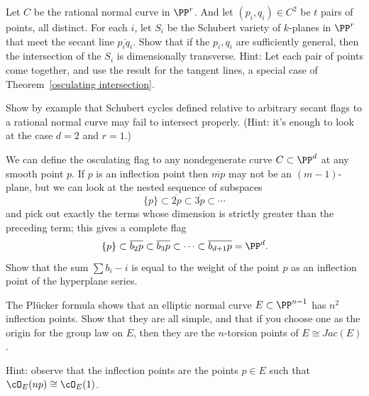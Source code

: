 \begin{exercise}\label{independent secants 0}
Let $C$ be the rational normal curve in $\PP^{r}$. And let $(p_{i},
q_{i})\in  C^{2}$ be $t$ pairs of points, all distinct.
For each $i$, let $S_{i}$ be the Schubert variety of $k$-planes in
$\PP^{r}$ that meet the secant line
$\overline{p_{i}q_{i}}$. Show that if the $p_{i}, q_{i}$ are sufficiently
general, then the intersection
of the $S_{i}$ is dimensionally transverse. Hint: Let each pair of points
come together, and use the result
for the tangent lines, a special case of Theorem~\ref{osculating
intersection}.
\end{exercise}

\begin{exercise}\label{only general secants}
Show by example that Schubert cycles defined relative to arbitrary secant
flags to a rational normal curve may fail to intersect properly. (Hint:
it's enough to look at the case $d=2$ and $r=1$.)
\end{exercise}

\begin{exercise}
We can define the osculating flag to any nondegenerate curve $C \subset
\PP^d$ at any smooth point $p$. If $p$ is an inflection point then
$\overline{mp}$ may not be an $(m-1)$-plane, but we can look at the
nested sequence of subspaces
$$
\{p\} \subset \overline{2p} \subset \overline{3p} \subset \cdots
$$
and pick out exactly the terms whose dimension is strictly greater than
the preceding term; this gives a complete flag
$$
\{p\} \subset \overline{b_2p} \subset \overline{b_3p} \subset \dots
\subset \overline{b_{d+1}p} = \PP^d
.
$$
Show that the sum $\sum b_i - i$ is equal to the weight of the point $p$
as an inflection point of the hyperplane series.
\end{exercise}


\begin{exercise}
The Pl\"ucker formula shows that an elliptic normal curve $E\subset
\PP^{n-1}$ has $n^2$ inflection points. Show that they are
all simple, and that if you choose one as the origin for the group law
on $E$, then
they are the $n$-torsion points of  $E \cong Jac(E)$.

Hint: observe that the inflection points are the points $p \in E$ such
that $\cO_E(np) \cong \cO_E(1)$.
\end{exercise}

